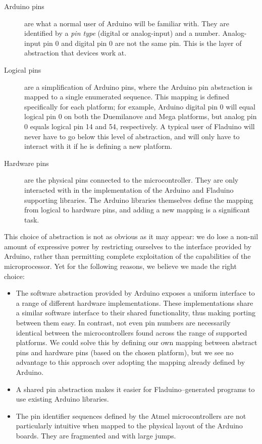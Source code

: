 \documentclass[a4paper, oneside, final]{memoir}
\begin{document}
\begin{description}
\item[Arduino pins] are what a normal user of Arduino will be familiar
  with.  They are identified by a \textit{pin type} (digital or
  analog-input) and a number.  Analog-input pin 0 and digital pin 0
  are not the same pin.  This is the layer of abstraction that devices
  work at.
\item[Logical pins] are a simplification of Arduino pins, where the
  Arduino pin abstraction is mapped to a single enumerated sequence.
  This mapping is defined specifically for each platform; for example,
  Arduino digital pin 0 will equal logical pin 0 on both the
  Duemilanove and Mega platforms, but analog pin 0 equals logical pin
  14 and 54, respectively.  A typical user of Fladuino will never have
  to go below this level of abstraction, and will only have to
  interact with it if he is defining a new platform.
\item[Hardware pins] are the physical pins connected to the
  microcontroller.  They are only interacted with in the
  implementation of the Arduino and Fladuino supporting libraries.
  The Arduino libraries themselves define the mapping from logical to
  hardware pins, and adding a new mapping is a significant task.
\end{description}

This choice of abstraction is not as obvious as it may appear: we do
lose a non-nil amount of expressive power by restricting ourselves to
the interface provided by Arduino, rather than permitting complete
exploitation of the capabilities of the microprocessor.  Yet for the
following reasons, we believe we made the right choice:

\begin{itemize}
\item The software abstraction provided by Arduino exposes a uniform
  interface to a range of different hardware implementations.  These
  implementations share a similar software interface to their shared
  functionality, thus making porting between them easy.  In contrast,
  not even pin numbers are necessarily identical between the
  microcontrollers found across the range of supported platforms.  We
  could solve this by defining our own mapping between abstract pins
  and hardware pins (based on the chosen platform), but we see no
  advantage to this approach over adopting the mapping already defined
  by Arduino.
\item A shared pin abstraction makes it easier for Fladuino--generated
  programs to use existing Arduino libraries.
\item The pin identifier sequences defined by the Atmel
  microcontrollers are not particularly intuitive when mapped to the
  physical layout of the Arduino boards.  They are fragmented and with
  large jumps.
\end{itemize}
\end{document}
